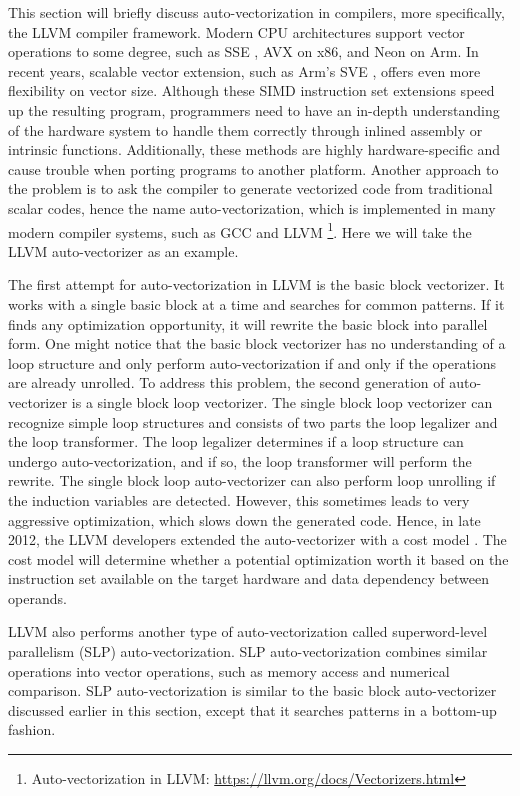 This section will briefly discuss auto-vectorization in compilers, more specifically, the LLVM compiler framework. Modern CPU architectures support vector operations to some degree, such as SSE \cite{sse-intel}, AVX \cite{avx-intel} on x86, and Neon \cite{arm-neon} on Arm. In recent years, scalable vector extension, such as Arm's SVE \cite{arm-sve}, offers even more flexibility on vector size. Although these SIMD instruction set extensions speed up the resulting program, programmers need to have an in-depth understanding of the hardware system to handle them correctly through inlined assembly or intrinsic functions. Additionally, these methods are highly hardware-specific and cause trouble when porting programs to another platform. Another approach to the problem is to ask the compiler to generate vectorized code from traditional scalar codes, hence the name auto-vectorization, which is implemented in many modern compiler systems, such as GCC \cite{auto-vec-gcc} and LLVM \footnote{Auto-vectorization in LLVM: \url{https://llvm.org/docs/Vectorizers.html}}. Here we will take the LLVM auto-vectorizer as an example.

The first attempt for auto-vectorization in LLVM is the basic block vectorizer. It works with a single basic block at a time and searches for common patterns. If it finds any optimization opportunity, it will rewrite the basic block into parallel form. One might notice that the basic block vectorizer has no understanding of a loop structure and only perform auto-vectorization if and only if the operations are already unrolled. To address this problem, the second generation of auto-vectorizer is a single block loop vectorizer. The single block loop vectorizer can recognize simple loop structures and consists of two parts the loop legalizer and the loop transformer. The loop legalizer determines if a loop structure can undergo auto-vectorization, and if so, the loop transformer will perform the rewrite. The single block loop auto-vectorizer can also perform loop unrolling if the induction variables are detected. However, this sometimes leads to very aggressive optimization, which slows down the generated code. Hence, in late 2012, the LLVM developers extended the auto-vectorizer with a cost model \cite{llvm-vec-cost, llvm-vec-cost-avx}. The cost model will determine whether a potential optimization worth it based on the instruction set available on the target hardware and data dependency between operands.

LLVM also performs another type of auto-vectorization called superword-level parallelism (SLP) auto-vectorization. SLP auto-vectorization combines similar operations into vector operations, such as memory access and numerical comparison. SLP auto-vectorization is similar to the basic block auto-vectorizer discussed earlier in this section, except that it searches patterns in a bottom-up fashion.

